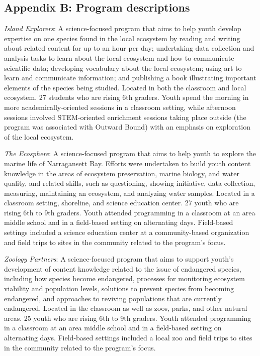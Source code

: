 \documentclass[]{msu-thesis}
\theoremstyle{definition}
\theoremstyle{definition}
\theoremstyle{definition}
\theoremstyle{remark}
\begin{document}
\subsection{Appendix B: Program
descriptions}\label{appendix-b-program-descriptions}

\emph{Island Explorers}: A science-focused program that aims to help
youth develop expertise on one species found in the local ecosystem by
reading and writing about related content for up to an hour per day;
undertaking data collection and analysis tasks to learn about the local
ecosystem and how to communicate scientific data; developing vocabulary
about the local ecosystem; using art to learn and communicate
information; and publishing a book illustrating important elements of
the species being studied. Located in both the classroom and local
ecosystem. 27 students who are rising 6th graders. Youth spend the
morning in more academically-oriented sessions in a classroom setting,
while afternoon sessions involved STEM-oriented enrichment sessions
taking place outside (the program was associated with Outward Bound)
with an emphasis on exploration of the local ecosystem.

\emph{The Ecosphere}: A science-focused program that aims to help youth
to explore the marine life of Narragansett Bay. Efforts were undertaken
to build youth content knowledge in the areas of ecosystem preservation,
marine biology, and water quality, and related skills, such as
questioning, showing initiative, data collection, measuring, maintaining
an ecosystem, and analyzing water samples. Located in a classroom
setting, shoreline, and science education center. 27 youth who are
rising 6th to 9th graders. Youth attended programming in a classroom at
an area middle school and in a field-based setting on alternating days.
Field-based settings included a science education center at a
community-based organization and field trips to sites in the community
related to the program's focus.

\emph{Zoology Partners}: A science-focused program that aims to support
youth's development of content knowledge related to the issue of
endangered species, including how species become endangered, processes
for monitoring ecosystem viability and population levels, solutions to
prevent species from becoming endangered, and approaches to reviving
populations that are currently endangered. Located in the classroom as
well as zoos, parks, and other natural areas. 25 youth who are rising
6th to 9th graders. Youth attended programming in a classroom at an area
middle school and in a field-based setting on alternating days.
Field-based settings included a local zoo and field trips to sites in
the community related to the program's focus.
\end{document}
